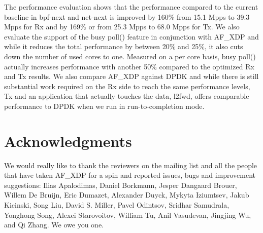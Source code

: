 \documentclass[9pt,numbers,reprint]{sigplanconf}
\begin{document}
The performance evaluation shows that the performance compared to the
current baseline in bpf-next and net-next is improved by 160\% from
15.1 Mpps to 39.3 Mpps for Rx and by 169\% or from 25.3 Mpps to 68.0
Mpps for Tx. We also evaluate the support of the busy poll() feature
in conjunction with AF\_XDP and while it reduces the total performance
by between 20\% and 25\%, it also cuts down the number of used cores
to one. Measured on a per core basis, busy poll() actually increases
performance with another 50\% compared to the optimized Rx and Tx
results. We also compare AF\_XDP against DPDK and while there is still
substantial work required on the Rx side to reach the same performance
levels, Tx and an application that actually touches the data, l2fwd,
offers comparable performance to DPDK when we run in run-to-completion
mode.


\section{Acknowledgments}
\label{sec:thanks}

We would really like to thank the reviewers on the mailing list and
all the people that have taken AF\_XDP for a spin and reported issues,
bugs and improvement suggestions: Ilias Apalodimas, Daniel Borkmann,
Jesper Dangaard Brouer, Willem De Bruijn, Eric Dumazet, Alexander
Duyck, Mykyta Iziumtsev, Jakub Kicinski, Song Liu, David S. Miller,
Pavel Odintsov, Sridhar Samudrala, Yonghong Song, Alexei Starovoitov,
William Tu, Anil Vasudevan, Jingjing Wu, and Qi Zhang. We owe you one.



\end{document}
